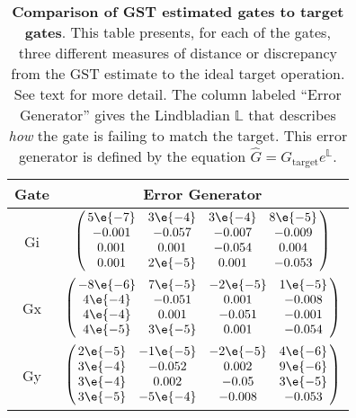 {\begin{table}[h]
\begin{center}
\vspace{2em}
\begin{tabular}[l]{|c|c|}
\hline
Gate & Error Generator \\ \hline
Gi & $ \left(\!\!\begin{array}{cccc}
5\e{-7} & 3\e{-4} & 3\e{-4} & 8\e{-5} \\ 
-0.001 & -0.057 & -0.007 & -0.009 \\ 
0.001 & 0.001 & -0.054 & 0.004 \\ 
0.001 & 2\e{-5} & 0.001 & -0.053
 \end{array}\!\!\right) $
 \\ \hline
Gx & $ \left(\!\!\begin{array}{cccc}
-8\e{-6} & 7\e{-5} & -2\e{-5} & 1\e{-5} \\ 
4\e{-4} & -0.051 & 0.001 & -0.008 \\ 
4\e{-4} & 0.001 & -0.051 & -0.001 \\ 
4\e{-5} & 3\e{-5} & 0.001 & -0.054
 \end{array}\!\!\right) $
 \\ \hline
Gy & $ \left(\!\!\begin{array}{cccc}
2\e{-5} & -1\e{-5} & -2\e{-5} & 4\e{-6} \\ 
3\e{-4} & -0.052 & 0.002 & 9\e{-6} \\ 
3\e{-4} & 0.002 & -0.05 & 3\e{-5} \\ 
3\e{-5} & -5\e{-4} & -0.008 & -0.053
 \end{array}\!\!\right) $
 \\ \hline
\end{tabular}

\caption{\textbf{Comparison of GST estimated gates to target gates}.  This table presents, for each of the gates, three different measures of distance or discrepancy from the GST estimate to the ideal target operation.  See text for more detail.  The column labeled ``Error Generator'' gives the Lindbladian $\mathbb{L}$ that describes \emph{how} the gate is failing to match the target.  This error generator is defined by the equation $\hat{G} = G_{\mathrm{target}}e^{\mathbb{L}}$. \label{bestCPTPGatesetVsTargetTable}}
\end{center}
\end{table}

}
